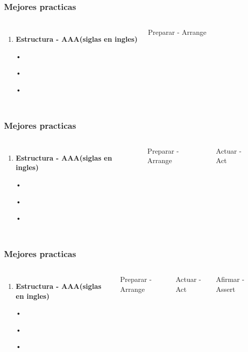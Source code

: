 \documentclass{beamer}
\begin{document}
\begin{frame}
\frametitle{Mejores practicas}
\begin{columns}[c] %

\begin{enumerate}
\item \textbf{Estructura - AAA(siglas en ingles)}
\item[•]	
\item[•]	
\item[•]	
\end{enumerate}

Preparar - Arrange
\end{columns}
\end{frame}

\begin{frame}
\frametitle{Mejores practicas}
\begin{columns}[c] %

\begin{enumerate}
\item \textbf{Estructura - AAA(siglas en ingles)}
\item[•]	
\item[•]	
\item[•]	
\end{enumerate}

Preparar - Arrange

Actuar - Act
\end{columns}
\end{frame}

\begin{frame}
\frametitle{Mejores practicas}
\begin{columns}[c] %

\begin{enumerate}
\item \textbf{Estructura - AAA(siglas en ingles)}
\item[•]	
\item[•]	
\item[•]	
\end{enumerate}

Preparar - Arrange

Actuar - Act

Afirmar - Assert
\end{columns}
\end{frame}
\end{document}
